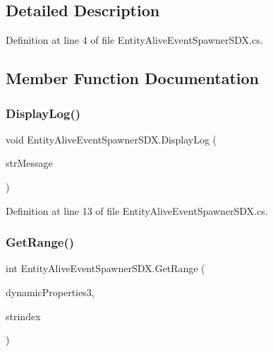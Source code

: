 \subsection{Detailed Description}


Definition at line 4 of file Entity\+Alive\+Event\+Spawner\+S\+D\+X.\+cs.



\subsection{Member Function Documentation}
\mbox{\label{class_entity_alive_event_spawner_s_d_x_a20053d6a00c0c2dd83cdcdad3fdbe87b}} 
\subsubsection{\texorpdfstring{DisplayLog()}{DisplayLog()}}
{\footnotesize\ttfamily void Entity\+Alive\+Event\+Spawner\+S\+D\+X.\+Display\+Log (\begin{DoxyParamCaption}\item[{String}]{str\+Message }\end{DoxyParamCaption})}



Definition at line 13 of file Entity\+Alive\+Event\+Spawner\+S\+D\+X.\+cs.

\mbox{\label{class_entity_alive_event_spawner_s_d_x_a1338080eabbcf5fdd0369097aabe828e}} 
\subsubsection{\texorpdfstring{GetRange()}{GetRange()}}
{\footnotesize\ttfamily int Entity\+Alive\+Event\+Spawner\+S\+D\+X.\+Get\+Range (\begin{DoxyParamCaption}\item[{Dynamic\+Properties}]{dynamic\+Properties3,  }\item[{String}]{strindex }\end{DoxyParamCaption})}



